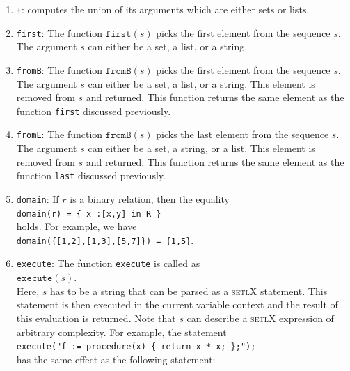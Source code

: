 \documentclass[11pt]{report}
\begin{document}
\begin{enumerate}
\item \texttt{+}: computes the union of its arguments which are either sets or lists.
\item \texttt{first}: The function $\texttt{first}(s)$ picks the first  element from the
      sequence $s$.  The argument $s$ can either be a set, a list, or a string.
      \item \texttt{fromB}: The function $\texttt{fromB}(s)$ picks the first element from the
      sequence $s$.  The argument $s$ can either be a set, a list, or a string.  This
      element is 
      removed from $s$ and returned.  This function returns the same element as the
      function \texttt{first} discussed previously.
\item \texttt{fromE}: The function $\texttt{fromB}(s)$ picks the last element from the
      sequence $s$.  The argument $s$ can either be a set, a string, or a list.  This element is
      removed from $s$ and returned.  This function returns the same element as the
      function \texttt{last} discussed previously.
\item \texttt{domain}: If $r$ is a binary relation, then the equality
      \\[0.2cm]
      \hspace*{1.3cm}
      \texttt{domain(r) = \{ x :[x,y] in R \}}
      \\[0.2cm]
      holds.  For example, we have
      \\[0.2cm]
      \hspace*{1.3cm}
      \texttt{domain(\{[1,2],[1,3],[5,7]\}) = \{1,5\}}.
\item \texttt{execute}: The function \texttt{execute}  is called as
      \\[0.2cm]
      \hspace*{1.3cm}
      $\mathtt{execute}(s)$.
      \\[0.2cm]
      Here, $s$ has to be a string that can be parsed as a \textsc{setlX} statement.  This statement
      is then executed in the current variable context and the result of this evaluation is
      returned.   Note that $s$ can describe a \textsc{setlX} expression of arbitrary complexity.
      For example, the statement
      \\[0.2cm]
      \hspace*{1.3cm}
      \texttt{execute("f := procedure(x) \{ return x * x; \};");}
      \\[0.2cm]
      has the same effect as the following statement:
      \\[0.2cm]

\end{enumerate}
\end{document}
